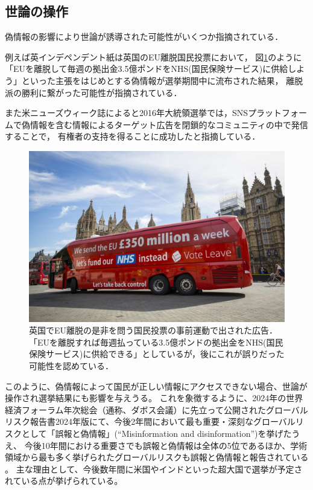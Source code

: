 \subsection{世論の操作}
偽情報の影響により世論が誘導された可能性がいくつか指摘されている．

例えば英インデペンデント紙は英国のEU離脱国民投票において，
図\ref{fig:leave}のように
「EUを離脱して毎週の拠出金3.5億ポンドをNHS(国民保険サービス)に供給しよう」といった主張\cite{merrick_2018}をはじめとする偽情報が選挙期間中に流布された結果，
離脱派の勝利に繋がった可能性が指摘されている\cite{grice_2017}．

また米ニューズウィーク誌によると2016年大統領選挙では，SNSプラットフォームで偽情報を含む情報によるターゲット広告を閉鎖的なコミュニティの中で発信することで，
有権者の支持を得ることに成功したと指摘している\cite{burleigh_2017}．

\begin{figure}[p]
    \includegraphics[width=\linewidth]{figures/fig_leave.jpg}
    \caption{英国でEU離脱の是非を問う国民投票の事前運動で出された広告．「EUを離脱すれば毎週払っている3.5億ポンドの拠出金をNHS(国民保険サービス)に供給できる」としているが，後にこれが誤りだった可能性を認めている\cite{merrick_2018}．}
    \label{fig:leave}
\end{figure}

このように、偽情報によって国民が正しい情報にアクセスできない場合、世論が操作され選挙結果にも影響を与えうる。
これを象徴するように、2024年の世界経済フォーラム年次総会（通称、ダボス会議）に先立って公開されたグローバルリスク報告書2024年版にて、今後2年間において最も重要・深刻なグローバルリスクとして「誤報と偽情報」(``Misinformation and disinformation'')を挙げたうえ、
今後10年間における重要さでも誤報と偽情報は全体の5位であるほか、学術領域から最も多く挙げられたグローバルリスクも誤報と偽情報と報告されている \cite{wef2024,wef2024_j}。
主な理由として、今後数年間に米国やインドといった超大国で選挙が予定されている点が挙げられている。


